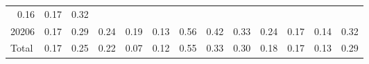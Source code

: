 \begin{table}[!h]
\begin{tabular}{lllllllllllll}
  \multicolumn{1}{r}{0.16} &
  \multicolumn{1}{r}{0.17} &
  \multicolumn{1}{r}{0.32} \\
\multicolumn{1}{l}{\hspace{1em}20206} &
  \multicolumn{1}{|r}{0.17} &
  \multicolumn{1}{r}{0.29} &
  \multicolumn{1}{r}{0.24} &
  \multicolumn{1}{r}{0.19} &
  \multicolumn{1}{r}{0.13} &
  \multicolumn{1}{r}{0.56} &
  \multicolumn{1}{r}{0.42} &
  \multicolumn{1}{r}{0.33} &
  \multicolumn{1}{r}{0.24} &
  \multicolumn{1}{r}{0.17} &
  \multicolumn{1}{r}{0.14} &
  \multicolumn{1}{r}{0.32} \\
\multicolumn{1}{l}{\hspace{1em}Total} &
  \multicolumn{1}{|r}{0.17} &
  \multicolumn{1}{r}{0.25} &
  \multicolumn{1}{r}{0.22} &
  \multicolumn{1}{r}{0.07} &
  \multicolumn{1}{r}{0.12} &
  \multicolumn{1}{r}{0.55} &
  \multicolumn{1}{r}{0.33} &
  \multicolumn{1}{r}{0.30} &
  \multicolumn{1}{r}{0.18} &
  \multicolumn{1}{r}{0.17} &
  \multicolumn{1}{r}{0.13} &
  \multicolumn{1}{r}{0.29} \\
\cline{1-13}
\end{tabular}
\end{table}
